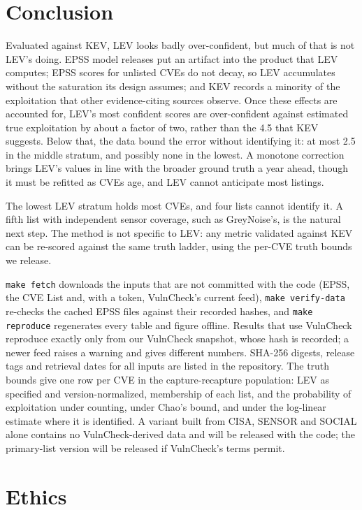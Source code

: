 \section{Conclusion}\label{sec:conclusion}

Evaluated against KEV, LEV looks badly over-confident, but much of that is not
LEV's doing. EPSS model releases put an artifact into the product that LEV
computes; EPSS scores for unlisted CVEs do not decay, so LEV accumulates without
the saturation its design assumes; and KEV records a minority of the
exploitation that other evidence-citing sources observe. Once these effects are
accounted for, LEV's most confident scores are over-confident against
estimated true exploitation by about a factor of two, rather than the 4.5 that
KEV suggests.
Below that, the data bound the error without identifying it: at most 2.5 in the
middle stratum, and possibly none in the lowest. A monotone correction brings
LEV's values in line with the broader ground truth a year ahead, though it must
be refitted as CVEs age, and LEV cannot anticipate most listings.

The lowest LEV stratum holds most CVEs, and four lists cannot identify it. A
fifth list with independent sensor coverage, such as GreyNoise's, is the
natural next step. The method is not specific to LEV: any metric validated
against KEV can be re-scored against the same truth ladder, using the per-CVE
truth bounds we release.

\texttt{make fetch} downloads the inputs that are not committed with the code
(EPSS, the CVE List and, with a token, VulnCheck's current feed),
\texttt{make verify-data} re-checks the cached EPSS files against their
recorded hashes, and \texttt{make reproduce} regenerates every table and
figure offline. Results that use VulnCheck reproduce exactly only from our
VulnCheck snapshot, whose hash is recorded; a newer feed raises a warning and
gives different numbers. SHA-256 digests, release tags and
retrieval dates for all inputs are listed in the repository. The truth bounds
give one row per CVE in the capture-recapture population: LEV as specified and
version-normalized, membership of each list, and the probability of exploitation
under counting, under Chao's bound, and under the log-linear estimate where it
is identified. A variant built from CISA, SENSOR and SOCIAL alone contains no
VulnCheck-derived data and will be released with the code; the primary-list version will be released if VulnCheck's
terms permit.

\section*{Ethics}

